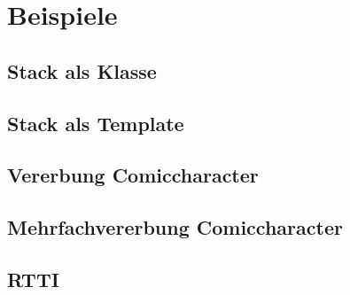 \section{Beispiele}
	\subsection{Stack als Klasse}
		
		\newpage
	
\newpage	
	\subsection{Stack als Template}
		
		\newpage
		
\newpage
 	\subsection{Vererbung Comiccharacter}
 		
 		
 		
 		
 		
 		
\newpage
	\subsection{Mehrfachvererbung Comiccharacter}
	 	
	 	
		
 		
 		
 		
 		
 		
 		
 		
 		\newpage
 		
\newpage
	\subsection{RTTI}
	 	
	